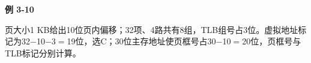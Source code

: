 {\color{ink}\bfseries 例 3-10}\par\vspace{1bp}页大小1 KB给出10位页内偏移；32项、4路共有8组，TLB组号占3位。虚拟地址标记为32\(-\)10\(-\)3\(=\allowbreak{}\)19位，选C；30位主存地址使页框号占30\(-\)10\(=\allowbreak{}\)20位，页框号与TLB标记分别计算。
